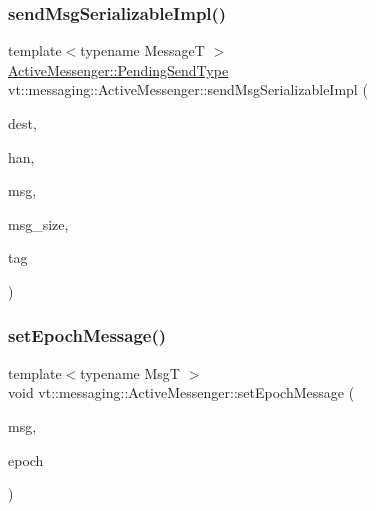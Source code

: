 \subsubsection{\texorpdfstring{send\+Msg\+Serializable\+Impl()}{sendMsgSerializableImpl()}}
{\footnotesize\ttfamily template$<$typename MessageT $>$ \\
\hyperlink{structvt_1_1messaging_1_1_active_messenger_a3626a6ca76d8ad4ec7c3b47a2c70d3a8}{Active\+Messenger\+::\+Pending\+Send\+Type} vt\+::messaging\+::\+Active\+Messenger\+::send\+Msg\+Serializable\+Impl (\begin{DoxyParamCaption}\item[{\hyperlink{namespacevt_a866da9d0efc19c0a1ce79e9e492f47e2}{Node\+Type}}]{dest,  }\item[{\hyperlink{namespacevt_af64846b57dfcaf104da3ef6967917573}{Handler\+Type}}]{han,  }\item[{\hyperlink{structvt_1_1messaging_1_1_msg_shared_ptr}{Msg\+Shared\+Ptr}$<$ MessageT $>$ \&}]{msg,  }\item[{\hyperlink{namespacevt_aab8d55968084610ce3b17057981e9300}{Byte\+Type}}]{msg\+\_\+size,  }\item[{\hyperlink{namespacevt_a84ab281dae04a52a4b243d6bf62d0e52}{Tag\+Type}}]{tag }\end{DoxyParamCaption})}

\mbox{\label{structvt_1_1messaging_1_1_active_messenger_a5fc9cb79e5cbef41007d847964c17113}} 
\subsubsection{\texorpdfstring{set\+Epoch\+Message()}{setEpochMessage()}}
{\footnotesize\ttfamily template$<$typename MsgT $>$ \\
void vt\+::messaging\+::\+Active\+Messenger\+::set\+Epoch\+Message (\begin{DoxyParamCaption}\item[{MsgT $\ast$}]{msg,  }\item[{\hyperlink{namespacevt_a985a5adf291c34a3ca263b3378388236}{Epoch\+Type}}]{epoch }\end{DoxyParamCaption})}



